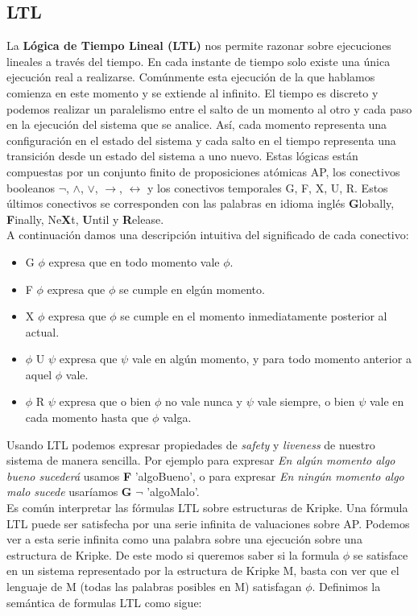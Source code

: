 \documentclass[titlepage, 12pt]{book}
\begin{document}
\subsection{LTL}
La \textbf{L\'ogica de Tiempo Lineal (LTL)} nos permite razonar sobre ejecuciones lineales a trav\'es del tiempo. En cada instante de tiempo solo existe una \'unica ejecuci\'on real a realizarse. Comúnmente esta ejecuci\'on de la que hablamos comienza en este momento y se extiende al infinito. El tiempo es discreto y podemos realizar un paralelismo entre el salto de un momento al otro y cada paso en la ejecuci\'on del sistema que se analice. As\'i, cada momento representa una configuraci\'on en el estado del sistema y cada salto en el tiempo representa una transici\'on desde un estado del sistema a uno nuevo. Estas l\'ogicas est\'an compuestas por un conjunto finito de proposiciones at\'omicas AP, los conectivos booleanos $\neg$, $\wedge$, $\vee$, $\rightarrow$, $\leftrightarrow$ y los conectivos temporales G, F, X, U, R. Estos \'ultimos conectivos se corresponden con las palabras en idioma ingl\'es \textbf{G}lobally, \textbf{F}inally, Ne\textbf{X}t, \textbf{U}ntil y \textbf{R}elease.\\ A continuaci\'on damos una descripci\'on intuitiva del significado de cada conectivo:
\begin{itemize}
\item G $\phi$ expresa que en todo momento vale $\phi$.
\item F $\phi$ expresa que $\phi$ se cumple en elg\'un momento.
\item X $\phi$ expresa que $\phi$ se cumple en el momento inmediatamente posterior al actual.
\item $\phi$ U $\psi$ expresa que $\psi$ vale en alg\'un momento, y para todo momento anterior a aquel $\phi$ vale.
\item $\phi$ R $\psi$ expresa que o bien $\phi$ no vale nunca y $\psi$ vale siempre, o bien $\psi$ vale en cada momento hasta que $\phi$ valga.
\end{itemize}
Usando LTL podemos expresar propiedades de \textit{safety} y \textit{liveness} de nuestro sistema de manera sencilla. Por ejemplo para expresar \textit{En alg\'un momento algo bueno suceder\'a} usamos  \textbf{F} 'algoBueno', o para expresar \textit{En ning\'un momento algo malo sucede} usar\'iamos \textbf{G} $\neg$ 'algoMalo'.\\

Es común interpretar las f\'ormulas LTL sobre estructuras de Kripke. Una f\'ormula LTL puede ser satisfecha por una serie infinita de valuaciones sobre AP. Podemos ver a esta serie infinita como una palabra sobre una ejecuci\'on sobre una estructura de Kripke. De este modo si queremos saber si la formula $\phi$ se satisface en un sistema representado por la estructura de Kripke M, basta con ver que el lenguaje de M (todas las palabras posibles en M) satisfagan $\phi$. Definimos la sem\'antica de formulas LTL como sigue:\\
\end{document}
